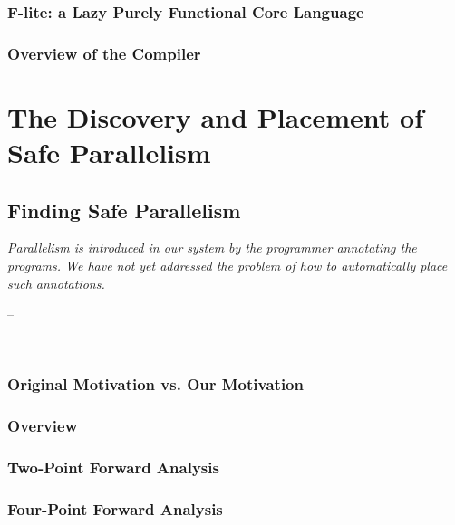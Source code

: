 \documentclass[openright, dottedtoc, headinclude, footinclude=true, a4paper, numbers=noenddot]{scrreprt}
\makeatletter
\newenvironment{chapquote}[2][2em]
  {\setlength{\@tempdima}{#1}%
   \def\chapquote@author{#2}%
   \parshape 1 \@tempdima \dimexpr\textwidth-2\@tempdima\relax%
   \itshape}
  {\par\normalfont\hfill--\ \chapquote@author\hspace*{\@tempdima}\par\noindent\hrulefill\\[1cm]}
\makeatother
\begin{document}
        \section{F-lite: a Lazy Purely Functional Core Language}
        \label{sec:Flite}
        
        
        \section{Overview of the Compiler}
        \label{sec:overview}
        

\part{The Discovery and Placement of Safe Parallelism}
\label{part:static}

    \chapter{Finding Safe Parallelism}
    \label{chap:discovery} 
    \begin{chapquote}{\cite{vGMachine}}
    Parallelism is introduced in our system by the programmer annotating the
    programs. We have not yet addressed the problem of how to automatically
    place such annotations.
    \end{chapquote}
    

        \section{Original Motivation vs. Our Motivation}
        
    
        \section{Overview}
        \label{sec:strictnessOverview}
        
    
        \section{Two-Point Forward Analysis}
        \label{sec:twoPoint}
        
    
        \section{Four-Point Forward Analysis}
        \label{sec:fourPoint}
        
    
\end{document}

